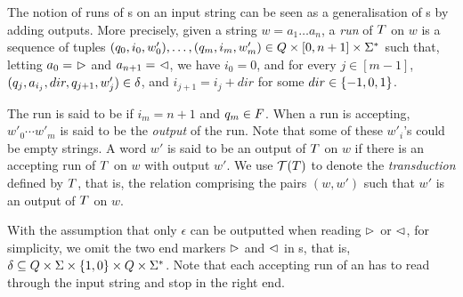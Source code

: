 %
%
The notion of runs of \FFT{}s on an input string can be seen as a generalisation 
of \FFA{}s by adding outputs. More precisely, given a string $w = a_1 \dots a_n$, a \emph{run} of $T$ on $w$
is a
sequence of tuples $(q_0, i_0, w'_0),\ldots, (q_m, i_m, w'_m) \in Q \times
[0, n+1] \times \Sigma^*$ 
such that, letting $a_0 =\ \vartriangleright$ and $a_{n+1} =\ \vartriangleleft$, 
we have $i_0 = 0$, and
 for every $j \in [m-1]$, $(q_j, a_{i_j}, dir, q_{j+1}, w'_j) \in
        \delta$, and $i_{j+1} = i_j + dir$ for some $dir \in \{-1, 0, 1\}$.
 
The run is said to be  if $i_m = n+1$ and $q_m \in F$.
When a run is accepting, $w'_0 \cdots w'_m$ is said to be the \emph{output} of the
run. Note that some of these $w'_i$'s could be empty strings.
A word $w'$ is said to be an output of $T$ on $w$ if there is an accepting run of
$T$ on $w$ with output $w'$. We use $\mathcal{T}(T)$ to denote the
\emph{transduction} defined by $T$, that is, the relation comprising
the pairs $(w,w')$ such that $w'$ is an output of $T$ on $w$. 

With the assumption that only $\epsilon$ can be outputted when reading $\vartriangleright$ or $\vartriangleleft$, for simplicity, we omit the two end markers $\vartriangleright$ and $\vartriangleleft$ in \FT{}s, that is, $\delta \subseteq Q \times \Sigma \times
    \{1,0\} \times Q \times \Sigma^*$. Note that each accepting run of an \FT{} has to read through the input string and stop in the right end.



